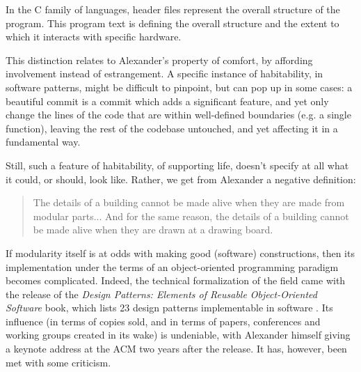 \begin{listing}
    \inputminted{rust}{./corpus/hardware_separation.h}
    \caption{In the C family of languages, header files represent the overall structure of the program. This program text is defining the overall structure and the extent to which it interacts with specific hardware.}
    \label{code:hardware-separation}
\end{listing}

This distinction relates to Alexander's property of comfort, by affording involvement instead of estrangement. A specific instance of habitability, in software patterns, might be difficult to pinpoint, but can pop up in some cases: a beautiful commit is a commit which adds a significant feature, and yet only change the lines of the code that are within well-defined boundaries (e.g. a single function), leaving the rest of the codebase untouched, and yet affecting it in a fundamental way.

Still, such a feature of habitability, of supporting life, doesn't specify at all what it could, or should, look like. Rather, we get from Alexander a negative definition:

\begin{quote}
    The details of a building cannot be made alive when they are made from modular parts... And for the same reason, the details of a building cannot be made alive when they are drawn at a drawing board. \citep{alexander_timeless_1979}
\end{quote}

If modularity itself is at odds with making good (software) constructions, then its implementation under the terms of an object-oriented programming paradigm becomes complicated. Indeed, the technical formalization of the field came with the release of the \emph{Design Patterns: Elements of Reusable Object-Oriented Software} book, which lists 23 design patterns implementable in software \citep{gamma_design_1994}. Its influence (in terms of copies sold, and in terms of papers, conferences and working groups created in its wake) is undeniable, with Alexander himself giving a keynote address at the ACM two years after the release. It has, however, been met with some criticism.

